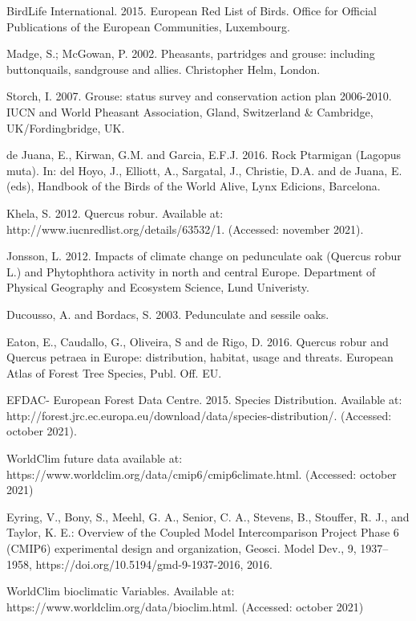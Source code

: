 \documentclass[12pt,a4paper]{article}
\begin{document}
\begin{thebibliography}{999}
BirdLife International. 2015. European Red List of Birds. Office for Official Publications of the European Communities, Luxembourg.

Madge, S.; McGowan, P. 2002. Pheasants, partridges and grouse: including buttonquails, sandgrouse and allies. Christopher Helm, London.

Storch, I. 2007. Grouse: status survey and conservation action plan 2006-2010. IUCN and World Pheasant Association, Gland, Switzerland \& Cambridge, UK/Fordingbridge, UK.

de Juana, E., Kirwan, G.M. and Garcia, E.F.J. 2016. Rock Ptarmigan (Lagopus muta). In: del Hoyo, J., Elliott, A., Sargatal, J., Christie, D.A. and de Juana, E. (eds), Handbook of the Birds of the World Alive, Lynx Edicions, Barcelona.

Khela, S. 2012. Quercus robur. Available at: http://www.iucnredlist.org/details/63532/1. (Accessed: november 2021).

Jonsson, L. 2012. Impacts of climate change on pedunculate oak (Quercus robur L.) and Phytophthora activity in north and central Europe. Department of Physical Geography and Ecosystem Science, Lund Univeristy.

Ducousso, A. and Bordacs, S. 2003. Pedunculate and sessile oaks.

Eaton, E., Caudallo, G., Oliveira, S and de Rigo, D. 2016. Quercus robur and Quercus petraea in Europe: distribution, habitat, usage and threats. European Atlas of Forest Tree Species, Publ. Off. EU.

EFDAC- European Forest Data Centre. 2015. Species Distribution. Available at: http://forest.jrc.ec.europa.eu/download/data/species-distribution/. (Accessed: october 2021).

WorldClim future data available at: https://www.worldclim.org/data/cmip6/cmip6climate.html. (Accessed: october 2021)

Eyring, V., Bony, S., Meehl, G. A., Senior, C. A., Stevens, B., Stouffer, R. J., and Taylor, K. E.: Overview of the Coupled Model Intercomparison Project Phase 6 (CMIP6) experimental design and organization, Geosci. Model Dev., 9, 1937–1958, https://doi.org/10.5194/gmd-9-1937-2016, 2016.

WorldClim bioclimatic Variables. Available at: https://www.worldclim.org/data/bioclim.html. (Accessed: october 2021)





















\end{thebibliography}
\end{document}

